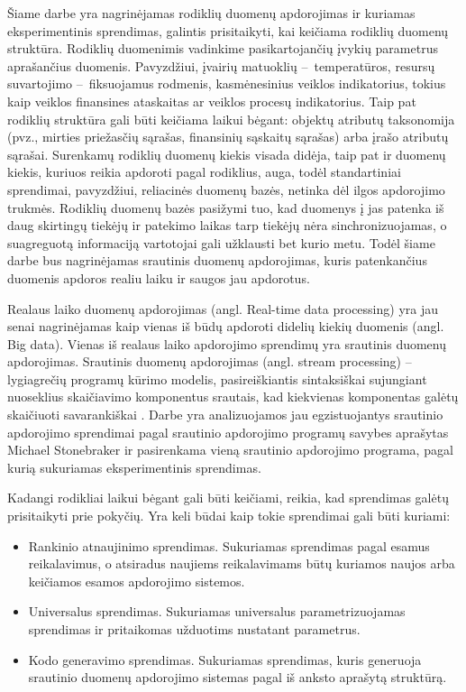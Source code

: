 \documentclass{VUMIFPSbakalaurinis}
\begin{document}
\tableofcontents

 
Šiame darbe yra nagrinėjamas rodiklių duomenų apdorojimas ir kuriamas eksperimentinis sprendimas, galintis prisitaikyti, kai keičiama rodiklių duomenų struktūra. Rodiklių duomenimis vadinkime pasikartojančių įvykių parametrus aprašančius duomenis. Pavyzdžiui, įvairių matuoklių – temperatūros, resursų suvartojimo – fiksuojamus rodmenis, kasmėnesinius veiklos indikatorius, tokius kaip veiklos finansines ataskaitas ar veiklos procesų indikatorius. Taip pat rodiklių struktūra gali būti keičiama laikui bėgant: objektų atributų taksonomija (pvz., mirties priežasčių sąrašas, finansinių sąskaitų sąrašas) arba įrašo atributų sąrašai. Surenkamų rodiklių duomenų kiekis visada didėja, taip pat ir duomenų kiekis, kuriuos reikia apdoroti pagal rodiklius, auga, todėl standartiniai sprendimai, pavyzdžiui, reliacinės duomenų bazės, netinka dėl ilgos apdorojimo trukmės. Rodiklių duomenų bazės pasižymi tuo, kad duomenys į jas patenka iš daug skirtingų tiekėjų ir patekimo laikas tarp tiekėjų nėra sinchronizuojamas, o suagreguotą informaciją vartotojai gali užklausti bet kurio metu. Todėl šiame darbe bus nagrinėjamas srautinis duomenų apdorojimas, kuris patenkančius duomenis apdoros realiu laiku ir saugos jau apdorotus. \par
Realaus laiko duomenų apdorojimas (angl. Real-time data processing) yra jau senai nagrinėjamas kaip vienas iš būdų apdoroti didelių kiekių duomenis (angl. Big data). Vienas iš realaus laiko apdorojimo sprendimų yra srautinis duomenų apdorojimas. Srautinis duomenų apdorojimas (angl. stream processing) – lygiagrečių programų kūrimo modelis, pasireiškiantis sintaksiškai sujungiant nuoseklius skaičiavimo komponentus srautais, kad kiekvienas komponentas galėtų skaičiuoti savarankiškai \cite{shortstreamproc}. Darbe yra analizuojamos jau egzistuojantys srautinio apdorojimo sprendimai pagal srautinio apdorojimo programų savybes aprašytas Michael Stonebraker ir pasirenkama vieną srautinio apdorojimo programa, pagal kurią sukuriamas eksperimentinis sprendimas. 
\par
Kadangi rodikliai laikui bėgant gali būti keičiami, reikia, kad sprendimas galėtų prisitaikyti prie pokyčių. Yra keli būdai kaip tokie sprendimai gali būti kuriami:
\begin{itemize}
    \item Rankinio atnaujinimo sprendimas. Sukuriamas sprendimas pagal esamus reikalavimus, o atsiradus naujiems reikalavimams būtų kuriamos naujos arba keičiamos esamos apdorojimo sistemos. 
    \item Universalus sprendimas. Sukuriamas universalus parametrizuojamas sprendimas ir pritaikomas užduotims nustatant parametrus.
    \item Kodo generavimo sprendimas. Sukuriamas sprendimas, kuris generuoja srautinio duomenų apdorojimo sistemas pagal iš anksto aprašytą struktūrą.  
\end{itemize}   
\end{document}
